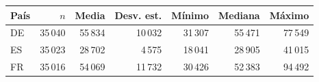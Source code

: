 \begin{tabular}{lrrrrrr}
\toprule
País & $n$ & Media & Desv. est. & Mínimo & Mediana & Máximo \\
\midrule
DE & 35\,040 & 55\,834 & 10\,032 & 31\,307 & 55\,471 & 77\,549 \\
ES & 35\,023 & 28\,702 & 4\,575 & 18\,041 & 28\,905 & 41\,015 \\
FR & 35\,016 & 54\,069 & 11\,732 & 30\,426 & 52\,383 & 94\,492 \\
\bottomrule
\end{tabular}